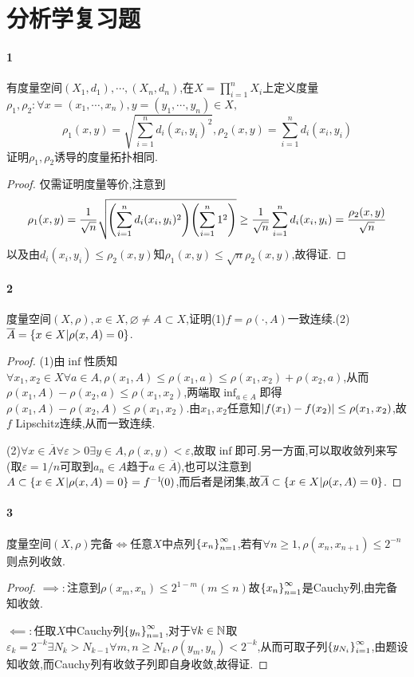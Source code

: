 \documentclass{article}
\begin{document}
\tableofcontents

\section{分析学复习题}
\paragraph{1}有度量空间$(X_1,d_1),\cdots,(X_n,d_n)$,在$X=\prod_{i=1}^{n}X_i$上定义度量$\rho_1,\rho_2:\forall x=(x_1,\cdots,x_n),y=(y_1,\cdots,y_n)\in X,$
$$\rho_1(x,y)=\sqrt{\sum_{i=1}^{n}d_i(x_i,y_i)^2},\rho_2(x,y)=\sum_{i=1}^{n}d_i(x_i,y_i)$$
证明$\rho_1,\rho_2$诱导的度量拓扑相同.
\begin{proof}
    仅需证明度量等价,注意到
    $$\rho_1(x,y)=\frac{1}{\sqrt{n}}\sqrt{\!\left(\sum_{i=1}^{n}d_i(x_i,y_i)^2\right)\!\left(\sum_{i=1}^{n}1^2\right)}\geq \frac{1}{\sqrt{n}}\sum_{i=1}^{n}d_i(x_i,y_i)=\frac{\rho_2(x,y)}{\sqrt{n}}$$
    以及由$d_i(x_i,y_i)\leq \rho_2(x,y)$知$\rho_1(x,y)\leq\sqrt{n}\rho_2(x,y)$,故得证.
\end{proof}

\paragraph{2}度量空间$(X,\rho), x\in X, \varnothing\neq A\subset X$,证明(1)$f=\rho(\cdot,A)$一致连续.(2)$\overline{A}=\left\{x\in X|\rho(x,A)=0\right\}$.
\begin{proof}
    (1)由$\inf$性质知$\forall x_1,x_2\in X\forall a\in A, \rho(x_1,A)\leq \rho(x_1,a)\leq \rho(x_1,x_2)+\rho(x_2,a)$,从而$\rho(x_1,A)-\rho(x_2,a)\leq\rho(x_1,x_2)$,两端取$\inf_{a\in A}$即得$\rho(x_1,A)-\rho(x_2,A)\leq \rho(x_1,x_2)$.由$x_1,x_2$任意知$\left|f(x_1)-f(x_2)\right|\leq \rho(x_1,x_2)$,故$f$ Lipschitz连续,从而一致连续.

    (2)$\forall x\in \overline{A}\forall\varepsilon>0\exists y\in A,\rho(x,y)<\varepsilon$,故取$\inf$即可.另一方面,可以取收敛列来写(取$\varepsilon=1/n$可取到$a_n\in A$趋于$a\in \overline{A}$),也可以注意到$A\subset \left\{x\in X|\rho(x,A)=0\right\}=f^{-1}\!(0)$,而后者是闭集,故$\overline{A}\subset \left\{x\in X|\rho(x,A)=0\right\}$.
\end{proof}

\paragraph{3}度量空间$(X,\rho)$完备$\iff$任意$X$中点列$\left\{x_n\right\}_{n=1}^\infty$,若有$\forall n\geq 1, \rho(x_n,x_{n+1})\leq 2^{-n}$则点列收敛.
\begin{proof}
    $\implies:$注意到$\rho(x_m,x_n)\leq 2^{1-m}(m\leq n)$故$\left\{x_n\right\}_{n=1}^\infty$是Cauchy列,由完备知收敛.

    $\impliedby:$任取$X$中Cauchy列$\left\{y_n\right\}_{n=1}^\infty$,对于$\forall k\in\mathbb{N}$取$\varepsilon_k=2^{-k}\exists N_k>N_{k-1}\forall m,n\geq N_k, \rho(y_m,y_n)<2^{-k}$,从而可取子列$\left\{y_{N_i}\right\}_{i=1}^\infty$,由题设知收敛,而Cauchy列有收敛子列即自身收敛,故得证.
\end{proof}
\end{document}
